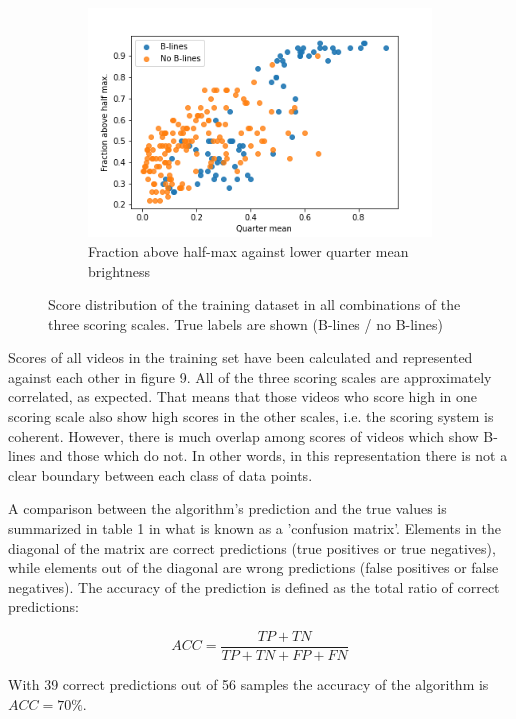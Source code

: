 \documentclass[11pt]{article} %
\begin{document}
\begin{figure}
		\begin{subfigure}{0.65\textwidth}
		\centering
		\includegraphics[width=\textwidth]{figuras/scores2_3.png}
		\caption{Fraction above half-max against lower quarter mean brightness}
		\end{subfigure}
	
	\caption{Score distribution of the training dataset in all combinations of the 	three scoring scales. True labels are shown (B-lines / no B-lines)}
	\end{figure}

	Scores of all videos in the training set have been calculated and represented  against each other in figure 9. All of the three scoring scales are approximately correlated, as expected. That means that those videos who score high in one scoring scale also show high scores in the other scales, i.e. the scoring system is coherent. However, there is much overlap among scores of videos which show B-lines and those which do not. In other words, in this representation there is not a clear boundary between each class of data points. 
	
	A comparison between the algorithm's prediction and the true values is summarized in table 1 in what is known as a 'confusion matrix'. Elements in the diagonal of the matrix are correct predictions (true positives or true negatives), while elements out of the diagonal are wrong predictions (false positives or false negatives).  The accuracy of the prediction is defined as the total ratio of correct predictions: 
	
	\[ ACC = \frac{TP + TN}{TP + TN + FP + FN}	\]
	
	With 39 correct predictions out of 56 samples the accuracy of the algorithm is $ACC = 70 \%$. 
	
\end{document}
